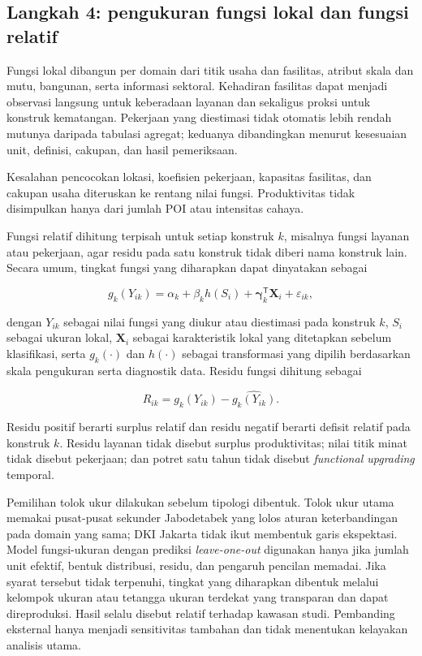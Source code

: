 \documentclass[11pt,a4paper,oneside,openany,indonesian]{report}
\begin{document}
\subsection{Langkah 4: pengukuran fungsi lokal dan fungsi
relatif}\label{langkah-4-pengukuran-fungsi-lokal-dan-fungsi-relatif}

Fungsi lokal dibangun per domain dari titik usaha dan fasilitas, atribut
skala dan mutu, bangunan, serta informasi sektoral. Kehadiran fasilitas
dapat menjadi observasi langsung untuk keberadaan layanan dan sekaligus
proksi untuk konstruk kematangan. Pekerjaan yang diestimasi tidak
otomatis lebih rendah mutunya daripada tabulasi agregat; keduanya
dibandingkan menurut kesesuaian unit, definisi, cakupan, dan hasil
pemeriksaan.

Kesalahan pencocokan lokasi, koefisien pekerjaan, kapasitas fasilitas,
dan cakupan usaha diteruskan ke rentang nilai fungsi. Produktivitas
tidak disimpulkan hanya dari jumlah POI atau intensitas cahaya.

Fungsi relatif dihitung terpisah untuk setiap konstruk \(k\), misalnya
fungsi layanan atau pekerjaan, agar residu pada satu konstruk tidak
diberi nama konstruk lain. Secara umum, tingkat fungsi yang diharapkan
dapat dinyatakan sebagai

\[
g_k(Y_{ik}) = \alpha_k + \beta_k h(S_i) + \boldsymbol{\gamma}_k^{\mathsf T}\mathbf{X}_i + \varepsilon_{ik},
\]

dengan \(Y_{ik}\) sebagai nilai fungsi yang diukur atau diestimasi pada
konstruk \(k\), \(S_i\) sebagai ukuran lokal, \(\mathbf{X}_i\) sebagai
karakteristik lokal yang ditetapkan sebelum klasifikasi, serta
\(g_k(\cdot)\) dan \(h(\cdot)\) sebagai transformasi yang dipilih
berdasarkan skala pengukuran serta diagnostik data. Residu fungsi
dihitung sebagai

\[
R_{ik}=g_k(Y_{ik})-\widehat{g_k(Y_{ik})}.
\]

Residu positif berarti surplus relatif dan residu negatif berarti
defisit relatif pada konstruk \(k\). Residu layanan tidak disebut
surplus produktivitas; nilai titik minat tidak disebut pekerjaan; dan
potret satu tahun tidak disebut \emph{functional upgrading} temporal.

Pemilihan tolok ukur dilakukan sebelum tipologi dibentuk. Tolok ukur
utama memakai pusat-pusat sekunder Jabodetabek yang lolos aturan
keterbandingan pada domain yang sama; DKI Jakarta tidak ikut membentuk
garis ekspektasi. Model fungsi-ukuran dengan prediksi
\emph{leave-one-out} digunakan hanya jika jumlah unit efektif, bentuk
distribusi, residu, dan pengaruh pencilan memadai. Jika syarat tersebut
tidak terpenuhi, tingkat yang diharapkan dibentuk melalui kelompok
ukuran atau tetangga ukuran terdekat yang transparan dan dapat
direproduksi. Hasil selalu disebut relatif terhadap kawasan studi.
Pembanding eksternal hanya menjadi sensitivitas tambahan dan tidak
menentukan kelayakan analisis utama.
\end{document}
